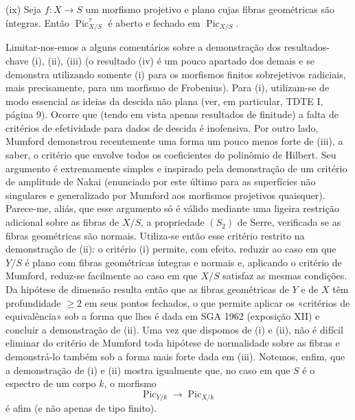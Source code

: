 \medskip
\noindent(ix) Seja $f:X\longrightarrow S$ um morfismo projetivo e plano cujas
fibras geométricas são íntegras. Então $\operatorname{Pic}_{X/S}^\tau$ é aberto
e fechado em $\operatorname{Pic}_{X/S}$.

Limitar-nos-emos a alguns comentários sobre a demonstração dos resultados-chave
(i), (ii), (iii) (o resultado (iv) é um pouco apartado dos demais e se demonstra
utilizando somente (i) para os morfismos finitos sobrejetivos radiciais, mais
precisamente, para um morfismo de Frobenius). Para (i), utilizam-se de modo
essencial as ideias da descida não plana (ver, em particular, TDTE I, página 9).
Ocorre que (tendo em vista apenas resultados de finitude) a falta de critérios
de efetividade para dados de descida é inofensiva. Por outro lado, Mumford
demonstrou recentemente uma forma um pouco menos forte de (iii), a saber, o
critério que envolve todos os coeficientes do polinômio de Hilbert. Seu
argumento é extremamente simples e inspirado pela demonstração de um critério
de amplitude de Nakai (enunciado por este último para as superfícies não
singulares e generalizado por Mumford aos morfismos projetivos quaisquer).
Parece-me, aliás, que esse argumento só é válido mediante uma ligeira restrição
adicional sobre as fibras de $X/S$, a propriedade $(S_2)$ de Serre, verificada
se as fibras geométricas são normais. Utiliza-se então esse critério restrito na
demonstração de (ii): o critério (i) permite, com efeito, reduzir ao caso em que
$Y/S$ é plano com fibras geométricas íntegras e normais e, aplicando o critério
de Mumford, reduz-se facilmente ao caso em que $X/S$ satisfaz as mesmas
condições. Da hipótese de dimensão resulta então que as fibras geométricas de
$Y$ e de $X$ têm profundidade $\geq2$ em seus pontos fechados, o que permite
aplicar os «critérios de equivalência» sob a forma que lhes é dada em SGA 1962
(exposição XII) e concluir a demonstração de (ii). Uma vez que dispomos de (i) e
(ii), não é difícil eliminar do critério de Mumford toda hipótese de normalidade
sobre as fibras e demonstrá-lo também sob a forma mais forte dada em (iii).
Notemos, enfim, que a demonstração de (i) e (ii) mostra igualmente que, no
caso em que $S$ é o espectro de um corpo $k$, o morfismo
\[
\operatorname{Pic}_{Y/k}\longrightarrow\operatorname{Pic}_{X/k}
\]
é afim (e não apenas de tipo finito).
